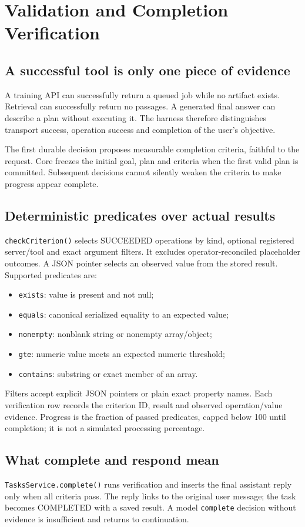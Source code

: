 \chapter{Validation and Completion Verification}
\section{A successful tool is only one piece of evidence}
A training API can successfully return a queued job while no artifact exists. Retrieval can successfully return no passages. A generated final answer can describe a plan without executing it. The harness therefore distinguishes transport success, operation success and completion of the user's objective.

The first durable decision proposes measurable completion criteria, faithful to the request. Core freezes the initial goal, plan and criteria when the first valid plan is committed. Subsequent decisions cannot silently weaken the criteria to make progress appear complete.
\section{Deterministic predicates over actual results}
\texttt{checkCriterion()} selects SUCCEEDED operations by kind, optional registered server/tool and exact argument filters. It excludes operator-reconciled placeholder outcomes. A JSON pointer selects an observed value from the stored result. Supported predicates are:
\begin{itemize}
\item \texttt{exists}: value is present and not null;
\item \texttt{equals}: canonical serialized equality to an expected value;
\item \texttt{nonempty}: nonblank string or nonempty array/object;
\item \texttt{gte}: numeric value meets an expected numeric threshold;
\item \texttt{contains}: substring or exact member of an array.
\end{itemize}
Filters accept explicit JSON pointers or plain exact property names. Each verification row records the criterion ID, result and observed operation/value evidence. Progress is the fraction of passed predicates, capped below 100 until completion; it is not a simulated processing percentage.
\section{What complete and respond mean}
\texttt{TasksService.complete()} runs verification and inserts the final assistant reply only when all criteria pass. The reply links to the original user message; the task becomes COMPLETED with a saved result. A model \texttt{complete} decision without evidence is insufficient and returns to continuation.

